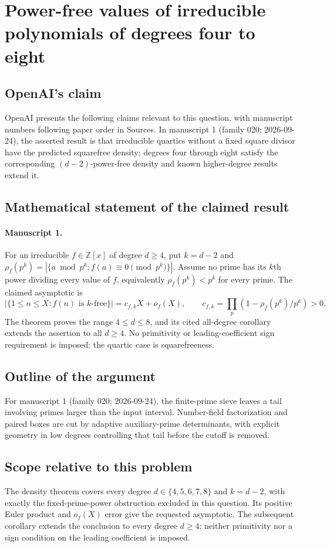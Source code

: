 \documentclass[11pt]{article}
\begin{document}
\section*{Power-free values of irreducible polynomials of degrees four to eight}

\subsection{OpenAI's claim}
OpenAI presents the following claims relevant to this question, with manuscript numbers following paper order in Sources. In manuscript 1 (family 020; 2026-09-24), the asserted result is that irreducible quartics without a fixed square divisor have the predicted squarefree density; degrees four through eight satisfy the corresponding $(d-2)$-power-free density and known higher-degree results extend it.

\subsection{Mathematical statement of the claimed result}
\paragraph{Manuscript 1.}
For an irreducible $f\in\mathbb Z[x]$ of degree $d\ge4$, put $k=d-2$ and $\rho_f(p^k)=|\{a\bmod p^k:f(a)\equiv0\pmod{p^k}\}|$. Assume no prime has its $k$th power dividing every value of $f$, equivalently $\rho_f(p^k)<p^k$ for every prime. The claimed asymptotic is
\[
 |\{1\le n\le X:f(n)\text{ is }k\text{-free}\}|
 =c_{f,k}X+o_f(X),\qquad
 c_{f,k}=\prod_p(1-\rho_f(p^k)/p^k)>0.
\]
The theorem proves the range $4\le d\le8$, and its cited all-degree corollary extends the assertion to all $d\ge4$. No primitivity or leading-coefficient sign requirement is imposed; the quartic case is squarefreeness.

\subsection{Outline of the argument}
For manuscript 1 (family 020; 2026-09-24), the finite-prime sieve leaves a tail involving primes larger than the input interval. Number-field factorization and paired boxes are cut by adaptive auxiliary-prime determinants, with explicit geometry in low degrees controlling that tail before the cutoff is removed.

\subsection{Scope relative to this problem}
The density theorem covers every degree $d\in\{4,5,6,7,8\}$ and $k=d-2$, with exactly the fixed-prime-power obstruction excluded in this question. Its positive Euler product and $o_f(X)$ error give the requested asymptotic. The subsequent corollary extends the conclusion to every degree $d\ge4$; neither primitivity nor a sign condition on the leading coefficient is imposed.
\end{document}

